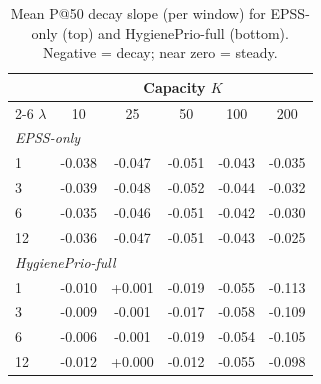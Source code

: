 \begin{table}[!t]
  \caption{Mean P@50 decay slope (per window) for EPSS-only (top) and HygienePrio-full (bottom). Negative = decay; near zero = steady.}
  \label{tab:slopes}
  \centering
  \small
  \setlength{\tabcolsep}{4pt}
  \begin{tabular}{lccccc}
    \toprule
    & \multicolumn{5}{c}{Capacity $K$} \\
    \cmidrule(lr){2-6}
    $\lambda$ & 10 & 25 & 50 & 100 & 200 \\
    \midrule
    \multicolumn{6}{l}{\textit{EPSS-only}} \\
    1 & -0.038 & -0.047 & -0.051 & -0.043 & -0.035 \\
    3 & -0.039 & -0.048 & -0.052 & -0.044 & -0.032 \\
    6 & -0.035 & -0.046 & -0.051 & -0.042 & -0.030 \\
    12 & -0.036 & -0.047 & -0.051 & -0.043 & -0.025 \\
    \midrule
    \multicolumn{6}{l}{\textit{HygienePrio-full}} \\
    1 & -0.010 & +0.001 & -0.019 & -0.055 & -0.113 \\
    3 & -0.009 & -0.001 & -0.017 & -0.058 & -0.109 \\
    6 & -0.006 & -0.001 & -0.019 & -0.054 & -0.105 \\
    12 & -0.012 & +0.000 & -0.012 & -0.055 & -0.098 \\
    \bottomrule
  \end{tabular}
\end{table}
